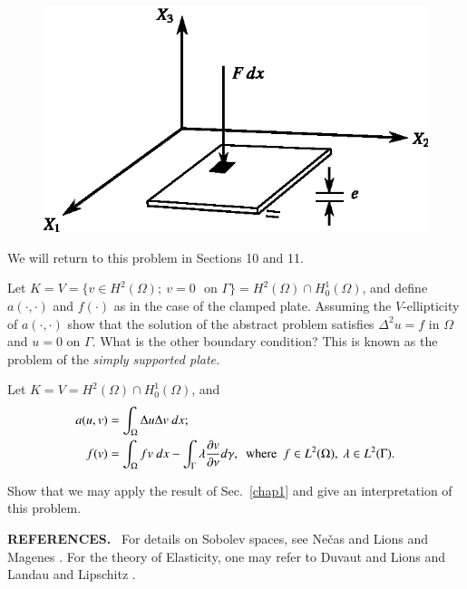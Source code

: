 \begin{figure}[H]
\centering
\includegraphics{figure/fig2.4.eps}
\caption{}\label{chap2-fig2.4}
\end{figure}

We will return to this problem in Sections 10 and 11.

\begin{exercise}\label{chap2-exer2.5}
Let $K=V=\{v\in H^{2}(\Omega);\ v=0\text{~ on~
}\Gamma\}=H^{2}(\Omega)\cap H^{1}_{0}(\Omega)$, and define
$a(\cdot,\cdot)$ and $f(\cdot)$ as in the case of the clamped
plate. Assuming the $V$-ellipticity of $a(\cdot,\cdot)$ show that the
solution of the abstract problem satisfies $\Delta^{2}u=f$ in $\Omega$
and $u=0$ on $\Gamma$. What is the other boundary condition? This is
known as the problem of the {\em simply supported plate.}
\end{exercise}

\begin{exercise}\label{chap2-exer2.6}
Let $K=V=H^{2}(\Omega)\cap H^{1}_{0}(\Omega)$, and
\begin{align*}
a(u,v) &= \int_{\Omega}\Delta u\Delta v\ dx;\\
f(v) &= \int_{\Omega}fv\ dx-\int_{\Gamma}\lambda\dfrac{\partial v}{\partial
  \nu}d\gamma,\text{~ where~ } f\in L^{2}(\Omega),\ \lambda \in
L^{2}(\Gamma). 
\end{align*}

Show that we may apply the result of Sec.~\ref{chap1} and give an
interpretation of this problem.
\end{exercise}

\noindent
{\bf REFERENCES.}~ For details on Sobolev spaces, see Ne\v{c}as
\cite{key20} and Lions and Magenes \cite{key17}. For the theory of
Elasticity, one may refer to Duvaut and Lions \cite{key10} and Landau
and Lipschitz \cite{key14}.
